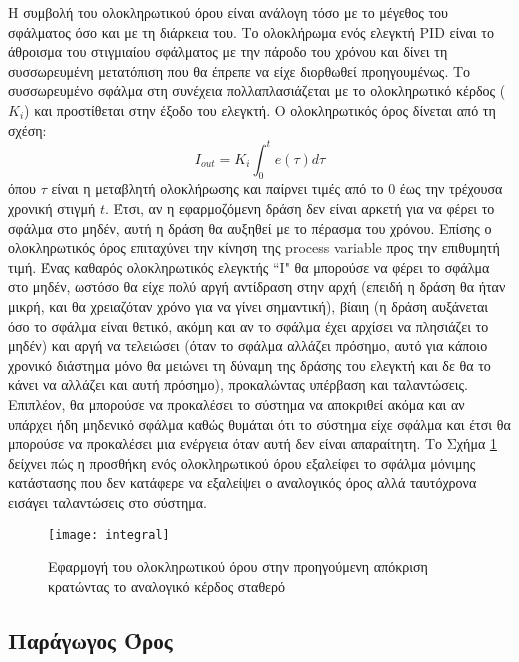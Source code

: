 Η συμβολή του ολοκληρωτικού όρου είναι ανάλογη τόσο με το μέγεθος του σφάλματος όσο και με τη διάρκεια του. Το ολοκλήρωμα ενός ελεγκτή PID είναι το άθροισμα του στιγμιαίου σφάλματος με την πάροδο του χρόνου και δίνει τη συσσωρευμένη μετατόπιση που θα έπρεπε να είχε διορθωθεί προηγουμένως. Το συσσωρευμένο σφάλμα στη συνέχεια πολλαπλασιάζεται με το ολοκληρωτικό κέρδος ($K_i$) και προστίθεται στην έξοδο του ελεγκτή. Ο ολοκληρωτικός όρος δίνεται από τη σχέση:
\begin{equation}
I_{out}=K_i \int_{0}^{t} e(\tau)d\tau
\label{eq:i_out}
\end{equation}
όπου $\tau$ είναι η μεταβλητή ολοκλήρωσης και παίρνει τιμές από το $0$ έως την τρέχουσα χρονική στιγμή $t$. Έτσι, αν η εφαρμοζόμενη δράση δεν είναι αρκετή για να φέρει το σφάλμα στο μηδέν, αυτή η δράση θα αυξηθεί με το πέρασμα του χρόνου. Επίσης ο ολοκληρωτικός όρος επιταχύνει την κίνηση της process variable προς την επιθυμητή τιμή. Ένας καθαρός ολοκληρωτικός ελεγκτής ``I" θα μπορούσε να φέρει το σφάλμα στο μηδέν, ωστόσο θα είχε πολύ αργή αντίδραση στην αρχή (επειδή η δράση θα ήταν μικρή, και θα χρειαζόταν χρόνο για να γίνει σημαντική), βίαιη (η δράση αυξάνεται όσο το σφάλμα είναι θετικό, ακόμη και αν το σφάλμα έχει αρχίσει να πλησιάζει το μηδέν) και αργή να τελειώσει (όταν το σφάλμα αλλάζει πρόσημο, αυτό για κάποιο χρονικό διάστημα μόνο θα μειώνει τη δύναμη της δράσης του ελεγκτή και δε θα το κάνει να αλλάζει και αυτή πρόσημο), προκαλώντας υπέρβαση και ταλαντώσεις. Επιπλέον, θα μπορούσε να προκαλέσει το σύστημα να αποκριθεί ακόμα και αν υπάρχει ήδη μηδενικό σφάλμα καθώς θυμάται ότι το σύστημα είχε σφάλμα και έτσι θα μπορούσε να προκαλέσει μια ενέργεια όταν αυτή δεν είναι απαραίτητη. Το Σχήμα \ref{fig:integral} δείχνει πώς η προσθήκη ενός ολοκληρωτικού όρου εξαλείφει το σφάλμα μόνιμης κατάστασης που δεν κατάφερε να εξαλείψει ο αναλογικός όρος αλλά ταυτόχρονα εισάγει ταλαντώσεις στο σύστημα.

\begin{figure}[h]
  \centering
  \texttt{[image: integral]}
  \caption{Εφαρμογή του ολοκληρωτικού όρου στην προηγούμενη απόκριση κρατώντας το αναλογικό κέρδος σταθερό}
  \label{fig:integral}
\end{figure}

\subsection{Παράγωγος Όρος}

